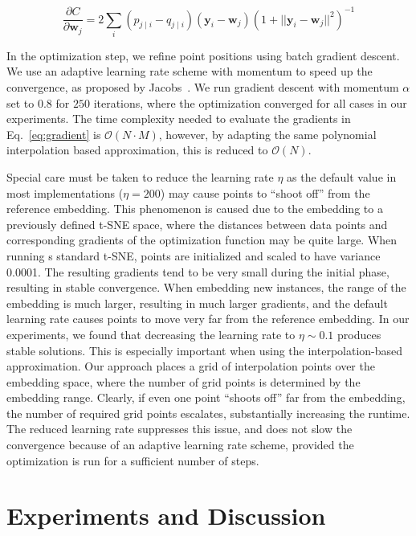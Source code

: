 \documentclass[runningheads]{llncs}
\begin{document}
\begin{equation}
\frac{\partial C}{\partial \mathbf{w}_j} = 2 \sum_i \left ( p_{j \mid i} - q_{j \mid i} \right ) \left ( \mathbf{y}_i - \mathbf{w}_j \right ) \left ( 1 + || \mathbf{y}_i - \mathbf{w}_j || ^2 \right )^{-1}
\label{eq:gradient}
\end{equation}

In the optimization step, we refine point positions using batch gradient
descent. We use an adaptive learning rate scheme with momentum 
to speed up the convergence, as proposed by Jacobs~\cite{momentum}. We run gradient descent
with momentum $\alpha$ set to $0.8$ for $250$ iterations, where the
optimization converged for all cases in our experiments.  The time complexity
needed to evaluate the gradients in Eq.~\ref{eq:gradient} is $\mathcal{O}(N
\cdot M)$, however, by adapting the same polynomial interpolation based
approximation, this is reduced to $\mathcal{O}(N)$.

Special care must be taken to reduce the learning rate $\eta$ as the default
value in most implementations ($\eta = 200$) may cause points to ``shoot off''
from the reference embedding. This phenomenon is caused due to the embedding to
a previously defined t-SNE space, where the distances between data points and
corresponding gradients of the optimization function may be quite large. When
running s standard t-SNE, points are initialized and scaled to have variance
0.0001. The resulting gradients tend to be very small during the initial phase,
resulting in stable convergence. When embedding new instances, the range of the
embedding is much larger, resulting in much larger gradients, and the default
learning rate causes points to move very far from the reference embedding. In
our experiments, we found that decreasing the learning rate to $\eta \sim 0.1$
produces stable solutions. This is especially important when using the
interpolation-based approximation. Our approach places a grid of interpolation
points over the embedding space, where the number of grid points is determined
by the embedding range. Clearly, if even one point ``shoots off'' far from the
embedding, the number of required grid points escalates, substantially
increasing the runtime. The reduced learning rate suppresses this issue, and
does not slow the convergence because of an adaptive learning rate scheme, provided
the optimization is run for a sufficient number of steps. 

\section{Experiments and Discussion}
\end{document}
